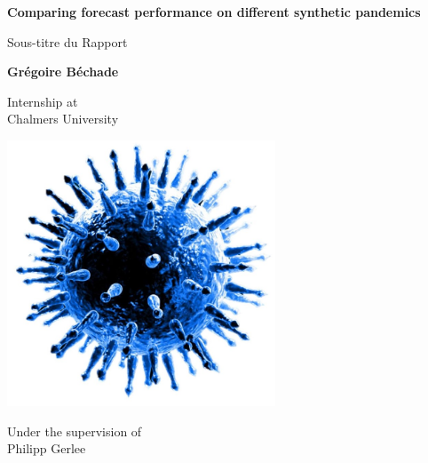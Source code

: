 \documentclass[11pt,a4paper]{article}
\begin{document}
\begin{titlepage}
    \begin{center}
        \vspace*{1cm}
        
        \Huge
        \textbf{Comparing forecast performance on different synthetic pandemics}
        
        \vspace{0.5cm}
        \LARGE
        Sous-titre du Rapport
        
        \vspace{1.5cm}
        
        \textbf{Grégoire Béchade}
        
        \vfill
        
        \Large
        Internship at \\
        Chalmers University
        
        \vspace{0.8cm}
        
        \includegraphics[width=0.6\textwidth]{figures/le virus_découpé_bis.jpg}
        
        \vfill
        
        \Large
        Under the supervision of \\
        Philipp Gerlee
        
        \vspace{0.8cm}
        
    \end{center}
\end{titlepage}

\newpage
\thispagestyle{empty}
\mbox{}
\newpage

\tableofcontents
\newpage







\printbibliography %
\end{document}
